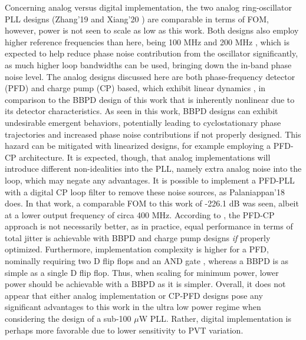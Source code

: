 Concerning analog versus digital implementation, the two analog ring-oscillator PLL designs (Zhang'19 \cite{Zhang2019} and Xiang'20 \cite{Xiang2020}) are comparable in terms of FOM, however, power is not seen to scale as low as this work. Both designs also employ higher reference frequencies than here, being 100 MHz \cite{Zhang2019} and 200 MHz \cite{Xiang2020}, which is expected to help reduce phase noise contribution from the oscillator significantly, as much higher loop bandwidths can be used, bringing down the in-band phase noise level. The analog designs discussed here are both phase-frequency detector (PFD) and charge pump (CP) based, which exhibit linear dynamics \cite{Razavi2020}, in comparison to the BBPD design of this work that is inherently nonlinear due to its detector characteristics. As seen in this work, BBPD designs can exhibit undesirable emergent behaviors, potentially leading to cyclostationary phase trajectories and increased phase noise contributions if not properly designed. This hazard can be mitigated with linearized designs, for example employing a PFD-CP architecture. It is expected, though, that analog implementations will introduce different non-idealities into the PLL, namely extra analog noise into the loop, which may negate any advantages. It is possible to implement a PFD-PLL with a digital CP loop filter to remove these noise sources, as Palaniappan'18 \cite{Palaniappan2018} does. In that work, a comparable FOM to this work of -226.1 dB was seen, albeit at a lower output frequency of circa 400 MHz. According to \cite{xu_abidi_2017}, the PFD-CP approach is not necessarily better, as in practice, equal performance in terms of total jitter is achievable with BBPD and charge pump designs \textit{if} properly optimized. Furthermore, implementation complexity is higher for a PFD, nominally requiring two D flip flops and an AND gate \cite{Razavi2020}, whereas a BBPD is as simple as a single D flip flop. Thus, when scaling for minimum power, lower power should be achievable with a BBPD as it is simpler. Overall, it does not appear that either analog implementation or CP-PFD designs pose any significant advantages to this work in the ultra low power regime when considering the design of a sub-100 $\mu$W PLL. Rather, digital implementation is perhaps more favorable due to lower sensitivity to PVT variation.

